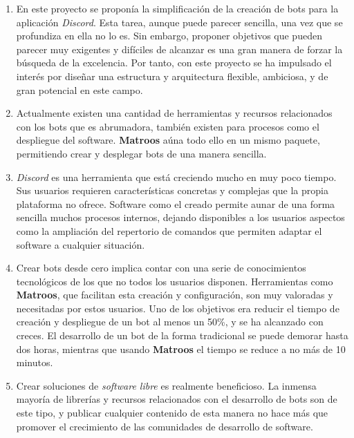 \begin{enumerate}
	\item En este proyecto se proponía la simplificación de la creación de bots para la aplicación \textit{Discord}. Esta tarea, aunque puede parecer sencilla, una vez que se profundiza en ella no lo es. Sin embargo, proponer objetivos que pueden parecer muy exigentes y difíciles de alcanzar es una gran manera de forzar la búsqueda de la excelencia. Por tanto, con este proyecto se ha impulsado el interés por diseñar una estructura y arquitectura flexible, ambiciosa, y de gran potencial en este campo.
	
	\item Actualmente existen una cantidad de herramientas y recursos relacionados con los bots que es abrumadora, también existen para procesos como el despliegue del software. \textbf{Matroos} aúna todo ello en un mismo paquete, permitiendo crear y desplegar bots de una manera sencilla.

	\item \textit{Discord} es una herramienta que está creciendo mucho en muy poco tiempo. Sus usuarios requieren características concretas y complejas que la propia plataforma no ofrece. Software como el creado permite aunar de una forma sencilla muchos procesos internos, dejando disponibles a los usuarios aspectos como la ampliación del repertorio de comandos que permiten adaptar el software a cualquier situación.

	\item Crear bots desde cero implica contar con una serie de conocimientos tecnológicos de los que no todos los usuarios disponen. Herramientas como \textbf{Matroos}, que facilitan esta creación y configuración, son muy valoradas y necesitadas por estos usuarios. Uno de los objetivos era reducir el tiempo de creación y despliegue de un bot al menos  un 50\%, y se ha alcanzado con creces. El desarrollo de un bot de la forma tradicional se puede demorar hasta dos horas, mientras que usando \textbf{Matroos} el tiempo se reduce a no más de 10 minutos.

	\item Crear soluciones de \textit{software libre} es realmente beneficioso. La inmensa mayoría de librerías y recursos relacionados con el desarrollo de bots son de este tipo, y publicar cualquier contenido de esta manera no hace más que promover el crecimiento de las comunidades de desarrollo de software.
\end{enumerate}





